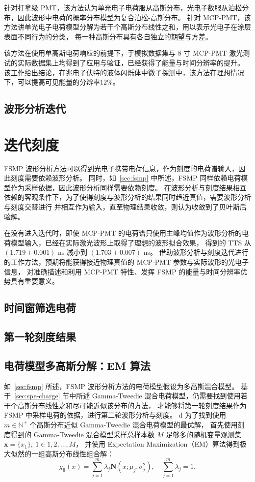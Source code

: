 针对打拿级 PMT，该方法认为单光电子电荷服从高斯分布，光电子数服从泊松分布，因此波形中电荷的概率分布模型为复合泊松-高斯分布。
针对 MCP-PMT，该方法讲单光电子电荷模型分解为若干个高斯分布线性之和，用以表示光电子在涂层表面不同行为的分类，
每一种高斯分布具有各自独立的期望与方差。

该方法在使用单高斯电荷响应的前提下，于模拟数据集与 8 寸 MCP-PMT 激光测试的实际数据集上均得到了应用与验证，已经获得了能量与时间分辨率的提升。
该工作给出结论，在兆电子伏特的液体闪烁体中微子探测中，该方法在理想情况下，可以提高可见能量的分辨率12\%。

\subsection{波形分析迭代}
\section{迭代刻度}
FSMP 波形分析方法可以得到光电子携带电荷信息，作为刻度的电荷谱输入，因此刻度需要依赖波形分析。
同时，如~\ref{sec:fsmp} 中所述，FSMP 同样依赖电荷模型作为采样依据，因此波形分析同样需要依赖刻度。
在波形分析与刻度结果相互依赖的客观条件下，为了使得刻度与波形分析的结果同时趋近真值，需要波形分析与刻度交替进行
并相互作为输入，直至物理结果收敛，则认为收敛到了贝叶斯后验解。

在没有进入迭代时，即使 MCP-PMT 的电荷谱只使用主峰均值作为波形分析的电荷模型输入，已经在实际激光波形上取得了理想的波形拟合效果，
得到的 TTS 从 $(1.719\pm0.001)$ ns 减小到 $(1.703\pm0.007)$ ns\cite{wangFastStochasticMatching2024a}。
借助波形分析与刻度迭代进行的工作方法，预期将能获得接近物理真值的 MCP-PMT 参数与实际波形的光电子信息，
对准确描述和利用 MCP-PMT 特性、发挥 FSMP 的能量与时间分辨率优势具有重要意义。

\subsection{时间窗筛选电荷}

\subsection{第一轮刻度结果}

\subsection{电荷模型多高斯分解：EM 算法}
如~\ref{sec:fsmp} 所述，FSMP 波形分析方法的电荷模型假设为多高斯混合模型。
基于~\ref{sec:spe-charge} 节中所述 Gamma-Tweedie 混合电荷模型，仍需要找到使用若干个高斯分布线性之和尽可能近似该分布的方法，
才能够将第一轮刻度结果作为 FSMP 中采样电荷的依据，进行第二轮波形分析与刻度。
d
为了找到使用 $m\in\mathbb{N}^{+}$ 个高斯分布近似 Gamma-Tweedie 混合电荷模型的最优解，
首先使用刻度得到的 Gamma-Tweedie 混合模型采样总样本数 $M$ 足够多的随机变量观测集 $\boldsymbol{x}=\{x_1\},\ 1\in{1, 2, \ldots, M}$，
并使用 Expectation Maximization（EM）算法得到极大似然的一组高斯分布线性组合解：
\begin{equation}
    g_{\boldsymbol{\theta}}(x)=\sum_{j=1}^m\lambda_j\mathbf{N}(x;\mu_j, \sigma_j^2),\quad\sum_{j=1}^{m}\lambda_j=1.
\end{equation}

